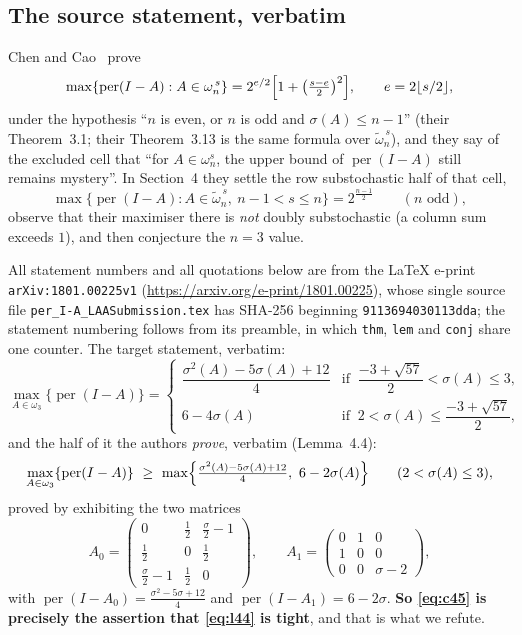 \documentclass[11pt]{amsart}
\theoremstyle{remark}
\DeclareMathOperator{\per}{per}
\newcommand{\ws}{\omega}
\newcommand{\wt}{\tilde{\omega}}
\begin{document}
\subsection*{The source statement, verbatim}
Chen and Cao~\cite{chencao} prove
\begin{equation}\label{eq:thm31}
 \max\{\per(I-A):A\in\ws_n^{\,s}\}
 =2^{e/2}\Bigl[1+\bigl(\tfrac{s-e}{2}\bigr)^{2}\Bigr],
 \qquad e=2\lfloor s/2\rfloor,
\end{equation}
under the hypothesis ``$n$ is even, or $n$ is odd and $\sigma(A)\le n-1$'' (their
Theorem~3.1; their Theorem~3.13 is the same formula over $\wt_n^{\,s}$), and they
say of the excluded cell that ``for $A\in\ws_n^s$, the upper bound of $\per(I-A)$
still remains mystery''. In Section~4 they settle the row substochastic half of
that cell,
\begin{equation}\label{eq:thm41}
 \max\{\per(I-A):A\in\wt_n^{\,s},\ n-1<s\le n\}=2^{\frac{n-1}{2}}
 \qquad (n \text{ odd}),
\end{equation}
observe that their maximiser there is \emph{not} doubly substochastic (a column sum
exceeds $1$), and then conjecture the $n=3$ value.

All statement numbers and all quotations below are from the \LaTeX{} e-print
\texttt{arXiv:1801.00225v1} (\url{https://arxiv.org/e-print/1801.00225}), whose single
source file \texttt{per\_I-A\_LAASubmission.tex} has SHA-256 beginning
\texttt{9113694030113dda}; the statement numbering follows from its preamble, in which
\texttt{thm}, \texttt{lem} and \texttt{conj} share one counter. The target statement,
verbatim:
\begin{equation}\label{eq:c45}
 \max_{A\in\ws_3}\{\per(I-A)\}=
 \begin{cases}
  \dfrac{\sigma^{2}(A)-5\sigma(A)+12}{4}
   &\text{if }\ \dfrac{-3+\sqrt{57}}{2}<\sigma(A)\le3,\\[8pt]
  6-4\sigma(A)
   &\text{if }\ 2<\sigma(A)\le\dfrac{-3+\sqrt{57}}{2},
 \end{cases}
\end{equation}
and the half of it the authors \emph{prove}, verbatim (Lemma~4.4):
\begin{equation}\label{eq:l44}
 \max_{A\in\ws_3}\{\per(I-A)\}
 \ \ge\ \max\Bigl\{\tfrac{\sigma^{2}(A)-5\sigma(A)+12}{4},\ 6-2\sigma(A)\Bigr\}
 \qquad(2<\sigma(A)\le3),
\end{equation}
proved by exhibiting the two matrices
\begin{equation}\label{eq:their}
 A_0=\begin{pmatrix}0&\tfrac12&\tfrac{\sigma}{2}-1\\
   \tfrac12&0&\tfrac12\\ \tfrac{\sigma}{2}-1&\tfrac12&0\end{pmatrix},
 \qquad
 A_1=\begin{pmatrix}0&1&0\\1&0&0\\0&0&\sigma-2\end{pmatrix},
\end{equation}
with $\per(I-A_0)=\frac{\sigma^{2}-5\sigma+12}{4}$ and
$\per(I-A_1)=6-2\sigma$. \textbf{So \eqref{eq:c45} is precisely the assertion that
\eqref{eq:l44} is tight}, and that is what we refute.
\end{document}
